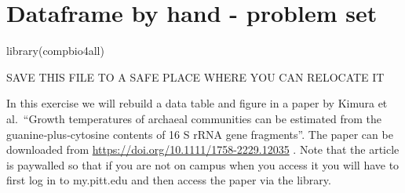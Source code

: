 \documentclass[
]{book}
\newenvironment{Shaded}{\begin{snugshade}}{\end{snugshade}}
\newcommand{\AttributeTok}[1]{\textcolor[rgb]{0.77,0.63,0.00}{#1}}
\newcommand{\CommentTok}[1]{\textcolor[rgb]{0.56,0.35,0.01}{\textit{#1}}}
\newcommand{\ConstantTok}[1]{\textcolor[rgb]{0.00,0.00,0.00}{#1}}
\newcommand{\FunctionTok}[1]{\textcolor[rgb]{0.00,0.00,0.00}{#1}}
\newcommand{\NormalTok}[1]{#1}
\newcommand{\OtherTok}[1]{\textcolor[rgb]{0.56,0.35,0.01}{#1}}
\newcommand{\SpecialCharTok}[1]{\textcolor[rgb]{0.00,0.00,0.00}{#1}}
\newcommand{\StringTok}[1]{\textcolor[rgb]{0.31,0.60,0.02}{#1}}
\begin{document}
\begin{Shaded}
\end{Shaded}

\hypertarget{dataframe-by-hand---problem-set}{%
\chapter{Dataframe by hand - problem set}\label{dataframe-by-hand---problem-set}}

\begin{Shaded}
\begin{Highlighting}[]
\FunctionTok{library}\NormalTok{(compbio4all)}
\end{Highlighting}
\end{Shaded}

SAVE THIS FILE TO A SAFE PLACE WHERE YOU CAN RELOCATE IT

In this exercise we will rebuild a data table and figure in a paper by Kimura et al.~``Growth temperatures of archaeal communities can be estimated from the guanine‐plus‐cytosine contents of 16 S rRNA gene fragments''. The paper can be downloaded from \url{https://doi.org/10.1111/1758-2229.12035} . Note that the article is paywalled so that if you are not on campus when you access it you will have to first log in to my.pitt.edu and then access the paper via the library.
\end{document}
